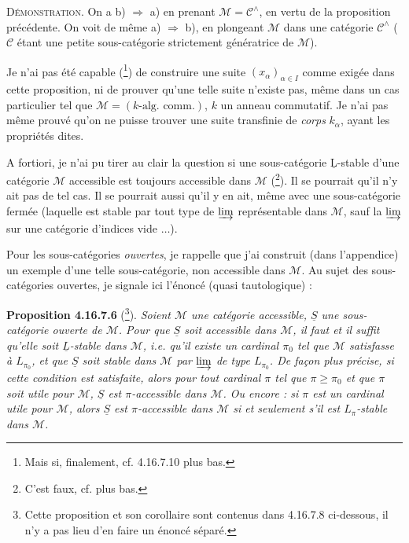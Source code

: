 \documentclass[11pt]{article}
\newcommand{\printedpage}[1]{\marginpar{\footnotesize p.~#1}}
\newcommand{\msp}[1]{\marginpar{\footnotesize [#1]}}
\newcommand{\cC}{\mathcal{C}}
\newcommand{\cM}{\mathcal{M}}
\newcommand{\uS}{\underline{S}}
\begin{document}
\textsc{Démonstration}. On a b) $\Longrightarrow$ a) en prenant $\cM = \cC^\wedge$, en vertu de la proposition précédente. On voit de même a) $\Longrightarrow$ b), en plongeant $\cM$ dans une catégorie $\cC^\wedge$ ($\cC$ étant une petite sous-catégorie strictement génératrice de $\cM$).

Je n'ai pas été capable (\footnote{Mais si, finalement, cf. 4.16.7.10 plus bas.}) de construire une suite $(x_\alpha)_{\alpha\in I}$ comme exigée dans cette proposition, ni de prouver qu'une telle suite n'existe pas, même dans un cas particulier tel que $\cM = (k\text{-alg. comm.})$, $k$ un anneau commutatif. Je n'ai pas
\msp{page 485}
même prouvé qu'on ne puisse trouver une suite transfinie de \textit{corps} $k_\alpha$, ayant les propriétés dites.

A fortiori, je n'ai pu tirer au clair la question si une sous-catégorie $\underline{\mathrm{L}}$-stable d'une catégorie $\cM$ accessible est toujours accessible dans $\cM$ (\footnote{C'est faux, cf. plus bas.}). Il se pourrait qu'il n'y ait pas de tel cas. Il se pourrait aussi qu'il y en ait, même avec une sous-catégorie fermée (laquelle est stable par tout type de $\varinjlim$ représentable dans $\cM$, sauf la $\varinjlim$ sur une catégorie d'indices vide $\ldots$).

\printedpage{188}

Pour les sous-catégories \textit{ouvertes}, je rappelle que j'ai construit (dans l'appendice) un exemple d'une telle sous-catégorie, non accessible dans $\cM$. Au sujet des sous-catégories ouvertes, je signale ici l'énoncé (quasi tautologique) :

\msp{page 486}
\textbf{Proposition 4.16.7.6} (\footnote{Cette proposition et son corollaire sont contenus dans 4.16.7.8 ci-dessous, il n'y a pas lieu d'en faire un énoncé séparé.}). \textit{Soient $\cM$ une catégorie accessible, $\uS$ une sous-catégorie \textup{ouverte} de $\cM$. Pour que $\uS$ soit accessible dans $\cM$, il faut et il suffit qu'elle soit $\underline{L}$-stable dans $\cM$, i.e. qu'il existe un cardinal $\pi_0$ tel que $\cM$ satisfasse à $L_{\pi_0}$, et que $\uS$ soit stable dans $\cM$ par $\varinjlim$ de type $L_{\pi_0}$. De façon plus précise, si cette condition est satisfaite, alors pour tout cardinal $\pi$ tel que $\pi \geqslant \pi_0$ et que $\pi$ soit utile pour $\cM$, $\uS$ est $\pi$-accessible dans $\cM$. Ou encore : si $\pi$ est un cardinal utile pour $\cM$, alors $\uS$ est $\pi$-accessible dans $\cM$ si et seulement s'il est $L_\pi$-stable dans $\cM$.}
\end{document}
